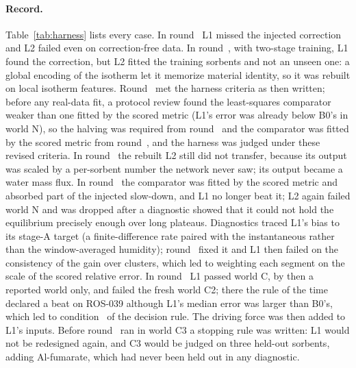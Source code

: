 \documentclass[11pt]{article}
\begin{document}
\paragraph{Record.} Table~\ref{tab:harness} lists every case. In round~ L1 missed the injected correction and L2 failed even
on correction-free data. In round~, with two-stage training, L1 found the correction, but L2 fitted the
training sorbents and not an unseen one: a global encoding of the isotherm let it memorize material identity, so it
was rebuilt on local isotherm features. Round~ met the harness criteria as then written; before any
real-data fit, a protocol review found the least-squares comparator weaker than one fitted by the scored metric (L1's
error was already below B0's in world N), so the halving was required from round~ and the comparator was fitted
by the scored metric from round~, and the harness was judged under these revised criteria. In round~ the rebuilt L2 still did not transfer, because its output was
scaled by a per-sorbent number the network never saw; its output became a water mass flux. In round~ the
comparator was fitted by the scored metric and absorbed part of the injected slow-down, and L1 no longer beat it; L2
again failed world N and was dropped after a diagnostic showed that it could not hold the equilibrium precisely
enough over long plateaus. Diagnostics traced L1's bias to its stage-A target (a finite-difference rate paired with
the instantaneous rather than the window-averaged humidity); round~ fixed it and L1 then failed on the
consistency of the gain over clusters, which led to weighting each segment on the scale of the scored relative error.
In round~ L1 passed world C, by then a reported world only, and failed the fresh world C2; there the rule of the
time declared a beat on ROS-039 although L1's median error was larger than B0's, which led to condition~ of the
decision rule. The driving force was then added to L1's inputs. Before round~ ran in world C3 a stopping rule
was written: L1 would not be redesigned again, and C3 would be judged on three held-out sorbents, adding Al-fumarate,
which had never been held out in any diagnostic.
\end{document}
